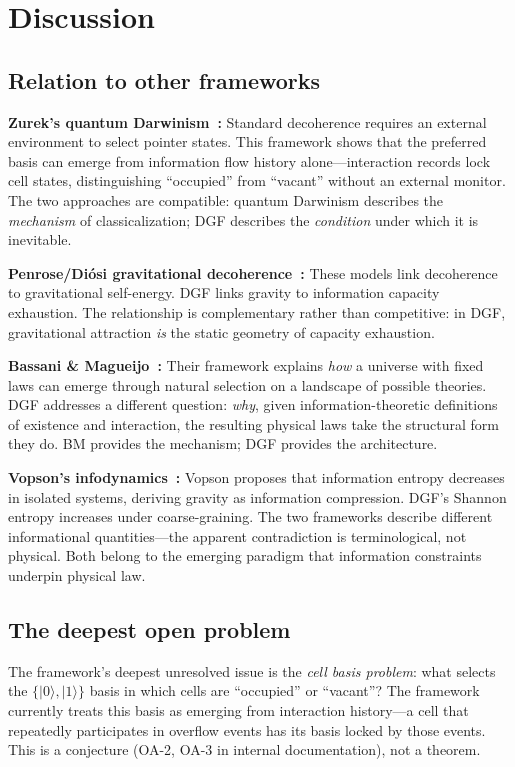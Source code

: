 \documentclass[reprint]{revtex4-2}
\begin{document}
\section{Discussion}

\subsection{Relation to other frameworks}

\textbf{Zurek's quantum Darwinism~\cite{Zurek2009}:} Standard decoherence requires an external environment to select pointer states. This framework shows that the preferred basis can emerge from information flow history alone---interaction records lock cell states, distinguishing ``occupied'' from ``vacant'' without an external monitor. The two approaches are compatible: quantum Darwinism describes the \emph{mechanism} of classicalization; DGF describes the \emph{condition} under which it is inevitable.

\textbf{Penrose/Di\'osi gravitational decoherence~\cite{Penrose1996,Diosi1989}:} These models link decoherence to gravitational self-energy. DGF links gravity to information capacity exhaustion. The relationship is complementary rather than competitive: in DGF, gravitational attraction \emph{is} the static geometry of capacity exhaustion.

\textbf{Bassani \& Magueijo~\cite{Bassani2025}:} Their framework explains \emph{how} a universe with fixed laws can emerge through natural selection on a landscape of possible theories. DGF addresses a different question: \emph{why}, given information-theoretic definitions of existence and interaction, the resulting physical laws take the structural form they do. BM provides the mechanism; DGF provides the architecture.

\textbf{Vopson's infodynamics~\cite{Vopson2023}:} Vopson proposes that information entropy decreases in isolated systems, deriving gravity as information compression. DGF's Shannon entropy increases under coarse-graining. The two frameworks describe different informational quantities---the apparent contradiction is terminological, not physical. Both belong to the emerging paradigm that information constraints underpin physical law.

\subsection{The deepest open problem}

The framework's deepest unresolved issue is the \emph{cell basis problem}: what selects the $\{|0\rangle,|1\rangle\}$ basis in which cells are ``occupied'' or ``vacant''? The framework currently treats this basis as emerging from interaction history---a cell that repeatedly participates in overflow events has its basis locked by those events. This is a conjecture (OA-2, OA-3 in internal documentation), not a theorem.
\end{document}
